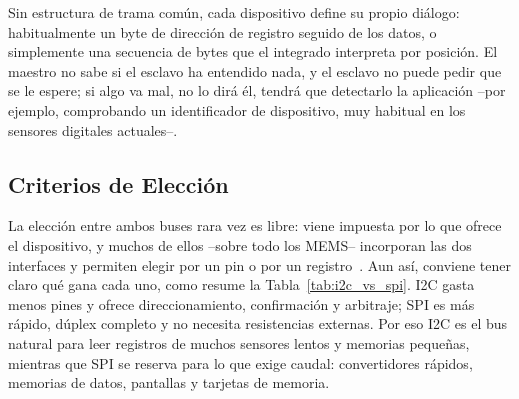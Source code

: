 
Sin estructura de trama común, cada dispositivo define su propio diálogo: habitualmente un byte de dirección de registro seguido de los datos, o simplemente una secuencia de bytes que el integrado interpreta por posición. El maestro no sabe si el esclavo ha entendido nada, y el esclavo no puede pedir que se le espere; si algo va mal, no lo dirá él, tendrá que detectarlo la aplicación --por ejemplo, comprobando un identificador de dispositivo, muy habitual en los sensores digitales actuales--.

\subsection{Criterios de Elección}\label{sub:criterios_buses}

La elección entre ambos buses rara vez es libre: viene impuesta por lo que ofrece el dispositivo, y muchos de ellos --sobre todo los MEMS-- incorporan las dos interfaces y permiten elegir por un pin o por un registro~\cite{horowitz2015art}. Aun así, conviene tener claro qué gana cada uno, como resume la Tabla~\ref{tab:i2c_vs_spi}. I2C gasta menos pines y ofrece direccionamiento, confirmación y arbitraje; SPI es más rápido, dúplex completo y no necesita resistencias externas. Por eso I2C es el bus natural para leer registros de muchos sensores lentos y memorias pequeñas, mientras que SPI se reserva para lo que exige caudal: convertidores rápidos, memorias de datos, pantallas y tarjetas de memoria.

